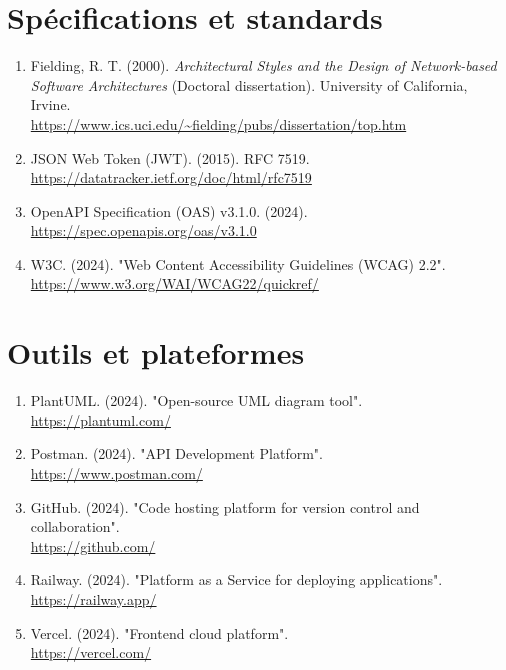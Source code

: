 \section{Spécifications et standards}

\begin{enumerate}
    \item Fielding, R. T. (2000). \textit{Architectural Styles and the Design of Network-based Software Architectures} (Doctoral dissertation). University of California, Irvine. \\
    \url{https://www.ics.uci.edu/~fielding/pubs/dissertation/top.htm}

    \item JSON Web Token (JWT). (2015). RFC 7519. \\
    \url{https://datatracker.ietf.org/doc/html/rfc7519}

    \item OpenAPI Specification (OAS) v3.1.0. (2024). \\
    \url{https://spec.openapis.org/oas/v3.1.0}

    \item W3C. (2024). "Web Content Accessibility Guidelines (WCAG) 2.2". \\
    \url{https://www.w3.org/WAI/WCAG22/quickref/}
\end{enumerate}

\section{Outils et plateformes}

\begin{enumerate}
    \item PlantUML. (2024). "Open-source UML diagram tool". \\
    \url{https://plantuml.com/}

    \item Postman. (2024). "API Development Platform". \\
    \url{https://www.postman.com/}

    \item GitHub. (2024). "Code hosting platform for version control and collaboration". \\
    \url{https://github.com/}

    \item Railway. (2024). "Platform as a Service for deploying applications". \\
    \url{https://railway.app/}

    \item Vercel. (2024). "Frontend cloud platform". \\
    \url{https://vercel.com/}
\end{enumerate}

